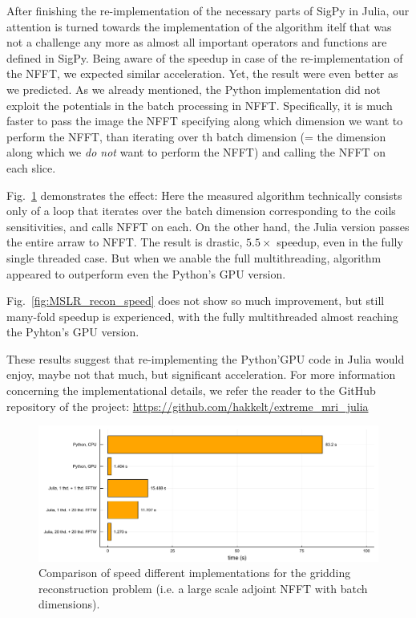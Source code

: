 After finishing the re-implementation of the necessary parts of SigPy in Julia, our attention is turned towards the implementation of the algorithm itelf that was not a challenge any more as almost all important operators and functions are defined in SigPy. Being aware of the speedup in case of the re-implementation of the NFFT, we expected similar acceleration. Yet, the result were even better as we predicted. As we already mentioned, the Python implementation did not exploit the potentials in the batch processing in NFFT. Specifically, it is much faster to pass the image the NFFT specifying along which dimension we want to perform the NFFT, than iterating over th batch dimension (= the dimension along which we \textit{do not} want to perform the NFFT) and calling the NFFT on each slice. 

Fig.~\ref{fig:gridding_recon_speed} demonstrates the effect: Here the measured algorithm technically consists only of a loop that iterates over the batch dimension corresponding to the coils sensitivities, and calls NFFT on each. On the other hand, the Julia version passes the entire arraw to NFFT. The result is drastic, $5.5\times$ speedup, even in the fully single threaded case. But when we anable the full multithreading, algorithm appeared to outperform even the Python's GPU version.

Fig.~\ref{fig:MSLR_recon_speed} does not show so much improvement, but still many-fold speedup is experienced, with the fully multithreaded almost reaching the Pyhton's GPU version.

These results suggest that re-implementing the Python'GPU code in Julia would enjoy, maybe not that much, but significant acceleration. For more information concerning the implementational details, we refer the reader to the GitHub repository of the project: \url{https://github.com/hakkelt/extreme_mri_julia}

\begin{figure}
    \centering
    \includegraphics[width=\linewidth]{images/gridding_recon_speed.pdf}
    \caption{Comparison of speed different implementations for the gridding reconstruction problem (i.e. a large scale adjoint NFFT with batch dimensions).}
    \label{fig:gridding_recon_speed}
\end{figure}

